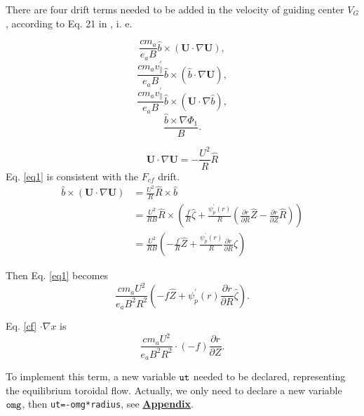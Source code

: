 \documentclass[12pt]{article}
\begin{document}
\begin{CJK*}{UTF8}{gbsn}
There are four drift terms needed to be added in the velocity of guiding center $V_{G}$, 
according to Eq. 21 in \cite{sugama98}, i. e.  

\begin{equation}
    \frac{cm_a}{e_aB}\hat{b} \times (\mathbf{U} \cdot \nabla \mathbf{U}), \label{eq1}
\end{equation}
\begin{equation}
    \frac{cm_av_{\parallel}^{'}}{e_aB} \hat{b} \times (\hat{b} \cdot \nabla \mathbf{U}), \label{eq2}
\end{equation}
\begin{equation}
    \frac{cm_av_{\parallel}^{'}}{e_aB} \hat{b} \times (\mathbf{U} \cdot\nabla\hat{b}), \label{eq3}
\end{equation}
\begin{equation}
    \frac{\hat{b}\times\nabla\Phi_1}{B}. \label{eq4}
\end{equation}

\begin{equation}
    \mathbf{U} \cdot \nabla \mathbf{U} = - \frac{U^2}{R} \hat{R}
\end{equation}
Eq. \ref{eq1} is consistent with the $F_{cf}$ drift.
\begin{equation}
    \begin{split}
        \hat{b} \times (\mathbf{U} \cdot \nabla \mathbf{U}) &= \frac{U^2}{R} \hat{R} \times \hat{b}\\
        &= \frac{U^2}{RB} \hat{R} \times (\frac{f}{R}\hat{\zeta} + \frac{\psi_{p}^{'}(r)}{R}(\frac{\partial r}{\partial R}\hat{Z} - \frac{\partial r}{\partial Z}\hat{R}))\\
        &= \frac{U^2}{RB} (-\frac{f}{R}\hat{Z} + \frac{\psi_{p}^{'}(r)}{R} \frac{\partial r}{\partial R}\hat{\zeta}) \label{eq5}
    \end{split}
\end{equation}

Then Eq. \ref{eq1} becomes  
\begin{equation}
    \frac{cm_aU^2}{e_aB^2R^2}(-f\hat{Z} + \psi_{p}^{'}(r)\frac{\partial r}{\partial R} \hat{\zeta}).\label{cf}
\end{equation}

Eq. \ref{cf} $\cdot \nabla x$ is
\begin{equation}
    \frac{cm_aU^2}{e_aB^2R^2} \cdot (-f) \frac{\partial r}{\partial Z}.
\end{equation}

To implement this term, a new variable ${\tt ut}$ needed to be declared, representing the equilibrium toroidal flow. 
Actually, we only need to declare a new variable ${\tt omg}$, then \texttt{ut=-omg*radius}, see \hyperref[app]{\bf Appendix}.


\end{CJK*}
\end{document}
